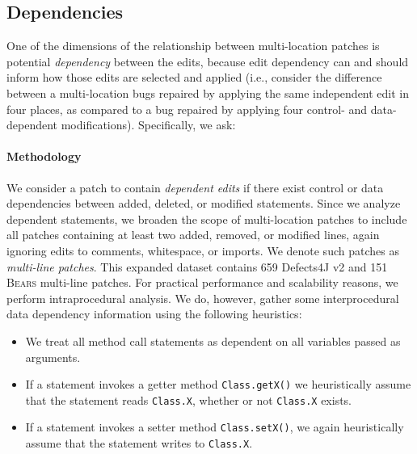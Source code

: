 \documentclass[10pt, conference]{IEEEtran}
\newcommand\bears{\textsc{Bears}\xspace}
\begin{document}
\subsection{Dependencies}

One of the dimensions of the relationship between multi-location patches is potential
\emph{dependency} between the edits, because edit dependency can and should
inform how those edits are selected and applied (i.e., consider the difference
between a multi-location
bugs repaired by applying the same independent edit in four places, as
compared to a bug repaired by applying  four control- and data-dependent
modifications).  Specifically, we ask:


\paragraph{Methodology}
We consider a patch to contain \emph{dependent edits} if there exist 
control or data dependencies between added, deleted, or modified statements.
Since we analyze dependent statements, we broaden the scope of multi-location patches to 
include all patches containing at least two added, removed, or modified lines, 
again ignoring edits to comments, whitespace, or imports.
We denote such patches as \emph{multi-line patches}.
This expanded dataset contains 659 Defects4J v2 and 151 \bears 
multi-line patches.
For practical performance and scalability reasons, 
we perform intraprocedural analysis. 
We do, however, gather some interprocedural data dependency information 
using the following heuristics:
\begin{itemize}
	\item We treat all method call statements as dependent on all variables
          passed as arguments. 
	\item If a statement invokes a getter method \texttt{Class.getX()} 
          we heuristically assume that the statement reads \texttt{Class.X},
          whether or not \texttt{Class.X} exists.
	\item If a statement invokes a setter method \texttt{Class.setX()}, 
	we again heuristically assume that the statement writes to \texttt{Class.X}. 
\end{itemize}
\end{document}
